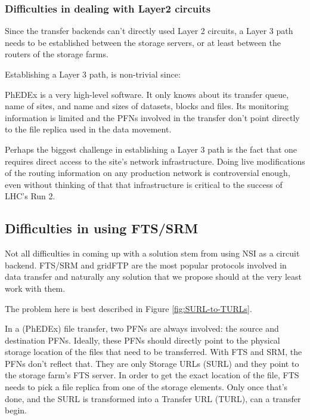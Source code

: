 \subsubsection{Difficulties in dealing with Layer2 circuits}

Since the transfer backends can't directly used Layer 2 circuits, a Layer 3 path needs to be 
established between the storage servers, or at least between the routers of the storage farms.

Establishing a Layer 3 path, is non-trivial since:
\begin{description}[style=unboxed,leftmargin=0cm]
  \item[It requires topology and routing info:] PhEDEx is a very high-level software. It only 
  knows about its transfer queue, name of sites, and name and sizes of datasets, blocks and 
  files. Its monitoring information is limited and the PFNs involved in the transfer don't 
  point directly to the file replica used in the data movement. 
  \item[Direct access to the site's network:] Perhaps the biggest challenge in establishing 
  a Layer 3 path is the fact that one requires direct access to the site's network infrastructure.
  Doing live modifications of the routing information on any production network is controversial 
  enough, even without thinking of that that infrastructure is critical to the success of LHC's 
  Run 2.
\end{description}

\subsection{Difficulties in using FTS/SRM}

Not all difficulties in coming up with a solution stem from using NSI as a circuit backend.
FTS/SRM and gridFTP are the most popular protocols involved in data transfer and naturally 
any solution that we propose should at the very least work with them. 

The problem here is best described in Figure \ref{fig:SURL-to-TURLs}.

In a (PhEDEx) file transfer, two PFNs are always involved: the source and destination PFNs. 
Ideally, these PFNs should directly point to the physical storage location 
of the files that need to be transferred. With FTS and SRM, the PFNs don't reflect that. 
They are only Storage URLs (SURL) and they point to the storage farm's FTS server. 
In order to get the exact location of the file, FTS needs to pick a file replica from one 
of the storage elements. Only once that's done, and the SURL is transformed into a Transfer 
URL (TURL), can a transfer begin.

